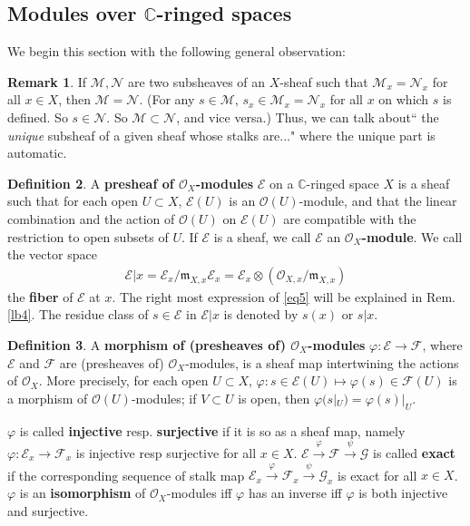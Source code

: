 \documentclass[12pt,b5paper,notitlepage]{report}
\theoremstyle{definition}
\newtheorem{df}{Definition}[section]
\newtheorem{rem}[df]{Remark}
\theoremstyle{plain}
\newcommand{\fk}{\mathfrak}
\newcommand{\scr}{\mathscr}
\newcommand{\Cbb}{\mathbb C}
\numberwithin{equation}{section}
\begin{document}
\subsection{Modules over $\Cbb$-ringed spaces}

We begin this section with the following general observation:
\begin{rem}\label{lb11}
If $\scr M,\scr N$ are two subsheaves of an $X$-sheaf such that $\scr M_x=\scr N_x$ for all $x\in X$, then $\scr M=\scr N$. (For any $s\in \scr M$, $s_x\in\scr M_x=\scr N_x$ for all $x$ on which $s$ is defined. So $s\in\scr N$. So $\scr M\subset\scr N$, and vice versa.) Thus, we can talk about`` the \textit{unique} subsheaf of a given sheaf whose stalks are..." where the unique part is automatic. 
\end{rem}

\begin{df}
A \textbf{presheaf of $\scr O_X$-modules} $\scr E$ on a $\Cbb$-ringed space $X$ is a sheaf such that for each open $U\subset X$, $\scr E(U)$ is an $\scr O(U)$-module, and that the linear combination and the action of $\scr O(U)$ on $\scr E(U)$ are compatible with the restriction to open subsets of $U$. If $\scr E$ is a sheaf, we call $\scr E$ an \textbf{$\scr O_X$-module}. We call the vector space \index{00@Fiber $\scr E\lvert x=\scr E_x/{\fk m_{X,x}\scr E_x}=\scr E_x\otimes(\scr O_{X,x}/\fk m_{X,x})$}
\begin{align}
\scr E|x=\scr E_x/{\fk m_{X,x}\scr E_x}=\scr E_x\otimes(\scr O_{X,x}/\fk m_{X,x})\label{eq5}
\end{align}
the \textbf{fiber} of $\scr E$ at $x$. The right most expression of \eqref{eq5} will be explained in Rem. \ref{lb4}. The residue class of $s\in \scr E$ in $\scr E|x$ is denoted by $s(x)$ or $s|x$. 
\end{df}

\begin{df}
A \textbf{morphism of (presheaves of) $\scr O_X$-modules} $\varphi:\scr E\rightarrow\scr F$, where $\scr E$ and $\scr F$ are (presheaves of) $\scr O_X$-modules, is a sheaf map intertwining the actions of $\scr O_X$. More precisely, for each open $U\subset X$, $\varphi:s\in\scr E(U)\mapsto \varphi(s)\in\scr F(U)$ is a morphism of $\scr O(U)$-modules; if $V\subset U$ is open, then $\varphi(s|_U)=\varphi(s)|_U$. 

$\varphi$ is called \textbf{injective} resp. \textbf{surjective} if it is so as a sheaf map, namely $\varphi:\scr E_x\rightarrow\scr F_x$ is injective resp surjective for all $x\in X$. $\scr E\xrightarrow{\varphi}\scr F\xrightarrow{\psi}\scr G$ is called \textbf{exact} if the corresponding sequence of stalk map $\scr E_x\xrightarrow{\varphi}\scr F_x\xrightarrow{\psi}\scr G_x$ is exact for all $x\in X$. $\varphi$ is an \textbf{isomorphism} of $\scr O_X$-modules iff $\varphi$ has an inverse iff $\varphi$ is both injective and surjective. \hfill\qedsymbol
\end{df}
\end{document}
